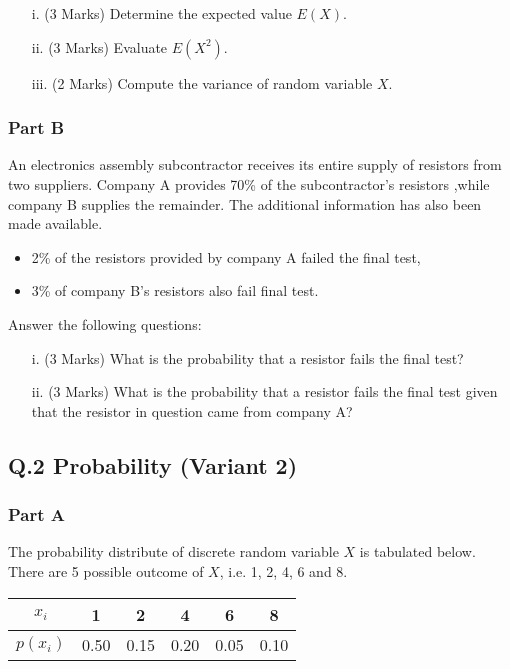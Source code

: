 \documentclass[a4paper,12pt]{article}
\begin{document}
\begin{itemize}
\item[i.] (3 Marks) Determine the expected value $E(X)$.
\item[ii.] (3 Marks) Evaluate $E(X^2)$.
\item[iii.] (2 Marks) Compute the variance of random variable $X$.
\end{itemize}


\subsubsection*{Part B}
An electronics assembly subcontractor receives its entire supply of resistors from two suppliers. Company A provides 70\% of the subcontractor's resistors ,while company B supplies the remainder. The additional information has also been made available.
\begin{itemize}
\item 2\% of the resistors provided by company A failed the final test,
\item 3\% of company B's resistors also fail final test.
\end{itemize}
\noindent Answer the following questions:
\begin{itemize}
\item[i.](3 Marks) What is the probability that a resistor fails the final test?
\item[ii.](3 Marks)  What is the probability that a resistor fails the final test given that the resistor in question came from company A?
\end{itemize}


\newpage
\subsection*{Q.2 Probability (Variant 2)}
\subsubsection*{Part A}
The probability distribute of discrete random variable $X$ is tabulated below. There are 5 possible outcome of $X$, i.e. 1, 2, 4, 6 and 8.
\begin{center}
\begin{tabular}{|c||c|c|c|c|c|}
\hline
$x_i$  & 1 & 2 & 4 & 6 & 8  \\\hline
$p(x_i)$ & 0.50 & 0.15 & 0.20 & 0.05 & 0.10 \\
\hline
\end{tabular}
\end{center}
\end{document}
